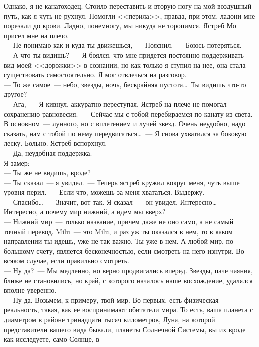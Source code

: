 Однако, я не канатоходец. Стоило переставить и вторую ногу на мой воздушный 
путь, как я чуть не рухнул. Помогли <<перила>>, правда, при этом, ладони мне 
порезали до крови. Ладно, понемногу, мы никуда не торопимся. Ястреб Мо присел 
мне на плечо.\\
--- Не понимаю как и куда ты движешься,~--- Пояснил.~--- Боюсь потеряться.\\
--- А что ты видишь?~--- Я боялся, что мне придется постоянно поддерживать вид 
моей <<дорожки>> в сознании, но как только я ступил на нее, она стала существовать 
самостоятельно. Я мог отвлечься на разговор.\\
--- То же самое~--- небо, звезды, ночь, бескрайняя пустота\ldots\ Ты видишь 
что-то другое?\\
--- Ага,~--- Я кивнул, аккуратно переступая. Ястреб на плече не помогал 
сохранению 
равновесия.~--- Сейчас мы с тобой перебираемся по канату из света. В 
основном~--- 
лунного, но с вплетением и лучей звезд. Очень неудобно, надо сказать, нам с 
тобой по нему передвигаться\ldots~--- Я снова ухватился за боковую леску. 
Больно. 
Ястреб вспорхнул.\\
--- Да, неудобная поддержка.\\
Я замер:\\
--- Ты же не видишь, вроде?\\
--- Ты сказал~--- я увидел.~--- Теперь ястреб кружил вокруг меня, чуть выше 
уровня перил.~--- Если что, можешь за меня хвататься. Выдержу.\\
--- Спасибо\ldots~--- Значит, вот так. Я сказал~--- он увидел. 
Интересно\ldots~--- Интересно, а почему мир нижний, а идем мы вверх?\\
--- Нижний мир~--- только название, причем даже не оно само, а не самый точный 
перевод. Milu~--- это Milu, и раз уж ты оказался в нем, то в каком направлении 
ты идешь, уже не так важно. Ты уже в нем. А любой мир, по большому счету, является 
бесконечностью, если смотреть на него изнутри. Во всяком случае, если правильно 
смотреть.\\
--- Ну да?~--- Мы медленно, но верно продвигались вперед. Звезды, паче чаяния, 
ближе 
не становились, но край, с которого началось наше восхождение, удалялся вполне 
уверенно.\\
--- Ну да. Возьмем, к примеру, твой мир. Во-первых, есть физическая реальность, 
такая, как ее воспринимают обитатели мира. То есть, ваша планета с диаметром в 
районе тринадцати тысяч километров, Луна, на которой представители вашего вида 
бывали, планеты Солнечной Системы, вы их вроде как исследуете, само Солнце, в 
